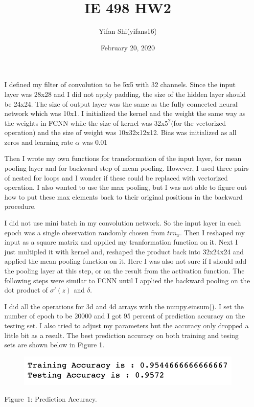 \documentclass{article}
\title{IE 498 HW2}
\author{Yifan Shi(yifans16)}
\date{February 20, 2020}
\begin{document}
\maketitle

I defined my filter of convolution to be 5x5 
with 32 channels. Since the input layer 
was 28x28 and I did not apply padding, the 
size of the hidden layer should be 24x24. 
The size of output layer was the same as the 
fully connected neural network which was 10x1. 
I initialized the kernel and the weight the 
same way as the weights in FCNN while the size 
of kernel was 32x$5^2$(for the vectorized 
operation) and the size of weight was 10x32x12x12. 
Bias was initialized as all zeros and learning rate 
$\alpha$ was 0.01


Then I wrote my own functions for transformation 
of the input layer, for mean pooling layer and 
for backward step of mean pooling. However, I 
used three pairs of nested for loops and I wonder 
if these could be replaced with vectorized 
operation. I also wanted to use the max pooling,
but I was not able to figure out how to put these 
max elements back to their original positions in 
the backward procedure. 


I did not use mini batch in my convolution network. So 
the input layer in each epoch was a single observation 
randomly chosen from $trn_x$. Then I reshaped my input as 
a square matrix and applied my tranformation function on 
it. Next I just multipled it with kernel and, reshaped the 
product back into 32x24x24 and applied the mean pooling 
function on it. Here I was also not sure if I should add 
the pooling layer at this step, or on the result from the 
activation function. The following steps were similar to 
FCNN until I applied the backward pooling on the dot 
product of $\sigma'(z)$ and $\delta$. 


I did all the operations for 3d and 4d arrays with the 
numpy.einsum(). I set the number of epoch to be 20000 
and I got 95 percent of prediction accuracy on the testing 
set. I also tried to adjust my parameters but the accuracy 
only dropped a little bit as a result. The best prediction 
accuracy on both training and tesing sets are shown below 
in Figure 1. 

\begin{figure}[h]
    \centering
    \includegraphics[scale=0.6]{accuracy.png}
  \end{figure}
\centering Figure\ 1: Prediction Accuracy.
\end{document}
